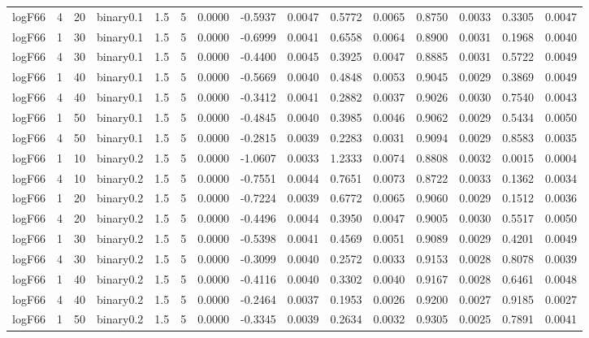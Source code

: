 \begin{longtable}{rrrrrrrrrrrrrrr}
  logF66 & 4 & 20 & binary0.1 & 1.5 & 5 & 0.0000 & -0.5937 & 0.0047 & 0.5772 & 0.0065 & 0.8750 & 0.0033 & 0.3305 & 0.0047 \\ 
  logF66 & 1 & 30 & binary0.1 & 1.5 & 5 & 0.0000 & -0.6999 & 0.0041 & 0.6558 & 0.0064 & 0.8900 & 0.0031 & 0.1968 & 0.0040 \\ 
  logF66 & 4 & 30 & binary0.1 & 1.5 & 5 & 0.0000 & -0.4400 & 0.0045 & 0.3925 & 0.0047 & 0.8885 & 0.0031 & 0.5722 & 0.0049 \\ 
  logF66 & 1 & 40 & binary0.1 & 1.5 & 5 & 0.0000 & -0.5669 & 0.0040 & 0.4848 & 0.0053 & 0.9045 & 0.0029 & 0.3869 & 0.0049 \\ 
  logF66 & 4 & 40 & binary0.1 & 1.5 & 5 & 0.0000 & -0.3412 & 0.0041 & 0.2882 & 0.0037 & 0.9026 & 0.0030 & 0.7540 & 0.0043 \\ 
  logF66 & 1 & 50 & binary0.1 & 1.5 & 5 & 0.0000 & -0.4845 & 0.0040 & 0.3985 & 0.0046 & 0.9062 & 0.0029 & 0.5434 & 0.0050 \\ 
  logF66 & 4 & 50 & binary0.1 & 1.5 & 5 & 0.0000 & -0.2815 & 0.0039 & 0.2283 & 0.0031 & 0.9094 & 0.0029 & 0.8583 & 0.0035 \\ 
  logF66 & 1 & 10 & binary0.2 & 1.5 & 5 & 0.0000 & -1.0607 & 0.0033 & 1.2333 & 0.0074 & 0.8808 & 0.0032 & 0.0015 & 0.0004 \\ 
  logF66 & 4 & 10 & binary0.2 & 1.5 & 5 & 0.0000 & -0.7551 & 0.0044 & 0.7651 & 0.0073 & 0.8722 & 0.0033 & 0.1362 & 0.0034 \\ 
  logF66 & 1 & 20 & binary0.2 & 1.5 & 5 & 0.0000 & -0.7224 & 0.0039 & 0.6772 & 0.0065 & 0.9060 & 0.0029 & 0.1512 & 0.0036 \\ 
  logF66 & 4 & 20 & binary0.2 & 1.5 & 5 & 0.0000 & -0.4496 & 0.0044 & 0.3950 & 0.0047 & 0.9005 & 0.0030 & 0.5517 & 0.0050 \\ 
  logF66 & 1 & 30 & binary0.2 & 1.5 & 5 & 0.0000 & -0.5398 & 0.0041 & 0.4569 & 0.0051 & 0.9089 & 0.0029 & 0.4201 & 0.0049 \\ 
  logF66 & 4 & 30 & binary0.2 & 1.5 & 5 & 0.0000 & -0.3099 & 0.0040 & 0.2572 & 0.0033 & 0.9153 & 0.0028 & 0.8078 & 0.0039 \\ 
  logF66 & 1 & 40 & binary0.2 & 1.5 & 5 & 0.0000 & -0.4116 & 0.0040 & 0.3302 & 0.0040 & 0.9167 & 0.0028 & 0.6461 & 0.0048 \\ 
  logF66 & 4 & 40 & binary0.2 & 1.5 & 5 & 0.0000 & -0.2464 & 0.0037 & 0.1953 & 0.0026 & 0.9200 & 0.0027 & 0.9185 & 0.0027 \\ 
  logF66 & 1 & 50 & binary0.2 & 1.5 & 5 & 0.0000 & -0.3345 & 0.0039 & 0.2634 & 0.0032 & 0.9305 & 0.0025 & 0.7891 & 0.0041 \\ 

\end{longtable}
